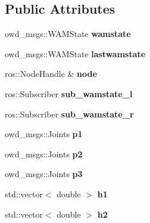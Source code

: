 \subsection*{Public Attributes}
\begin{DoxyCompactItemize}
\item 
\hypertarget{classTest_a1a6c6eeab358add44f4f2f6d933a1f97}{owd\-\_\-msgs\-::\-W\-A\-M\-State {\bfseries wamstate}}\label{classTest_a1a6c6eeab358add44f4f2f6d933a1f97}

\item 
\hypertarget{classTest_a84dbcfa8ac9d16889a3428d6ae32deb9}{owd\-\_\-msgs\-::\-W\-A\-M\-State {\bfseries lastwamstate}}\label{classTest_a84dbcfa8ac9d16889a3428d6ae32deb9}

\item 
\hypertarget{classTest_ad165c4503c06fffb063bce09c1c2267d}{ros\-::\-Node\-Handle \& {\bfseries node}}\label{classTest_ad165c4503c06fffb063bce09c1c2267d}

\item 
\hypertarget{classTest_a39b0a0a204b2ede6638610b698b15e68}{ros\-::\-Subscriber {\bfseries sub\-\_\-wamstate\-\_\-l}}\label{classTest_a39b0a0a204b2ede6638610b698b15e68}

\item 
\hypertarget{classTest_ac4795b228e9cc97e84b076102afb7dce}{ros\-::\-Subscriber {\bfseries sub\-\_\-wamstate\-\_\-r}}\label{classTest_ac4795b228e9cc97e84b076102afb7dce}

\item 
\hypertarget{classTest_aabdb12429637b5dca8c19a9021f97e8d}{owd\-\_\-msgs\-::\-Joints {\bfseries p1}}\label{classTest_aabdb12429637b5dca8c19a9021f97e8d}

\item 
\hypertarget{classTest_a190121298cbebeb55a2fe794ec7731a3}{owd\-\_\-msgs\-::\-Joints {\bfseries p2}}\label{classTest_a190121298cbebeb55a2fe794ec7731a3}

\item 
\hypertarget{classTest_a6de3e8de56287e5fe77c84c13d9bc8bc}{owd\-\_\-msgs\-::\-Joints {\bfseries p3}}\label{classTest_a6de3e8de56287e5fe77c84c13d9bc8bc}

\item 
\hypertarget{classTest_af024ef3364a1decd8cd2dda54cce1b77}{std\-::vector$<$ double $>$ {\bfseries h1}}\label{classTest_af024ef3364a1decd8cd2dda54cce1b77}

\item 
\hypertarget{classTest_aa3eeea4f067ca929aa03857884dc4d9b}{std\-::vector$<$ double $>$ {\bfseries h2}}\label{classTest_aa3eeea4f067ca929aa03857884dc4d9b}


\end{DoxyCompactItemize}
